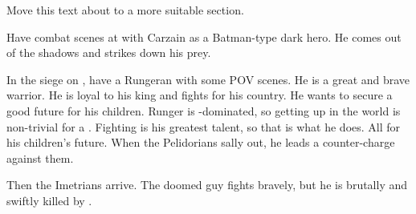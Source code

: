Move this text about  to a more suitable section. 




\begin{comment}
  \subsection{Carzain as Batman}
\end{comment}
Have combat scenes at \Forclin with Carzain as a Batman-type dark hero. 
He comes out of the shadows and strikes down his prey. 




\begin{comment}
  \section{Doomed Rungeran Scatha}
\end{comment}
\new
In the siege on \Forclin, have a Rungeran \scatha with some POV scenes.
He is a great and brave warrior.
He is loyal to his king and fights for his country.
He wants to secure a good future for his children.
Runger is \human-dominated, so getting up in the world is non-trivial for a \scatha.
Fighting is his greatest talent, so that is what he does.
All for his children's future.
When the Pelidorians sally out, he leads a counter-charge against them. 

Then the Imetrians arrive.
The doomed guy fights bravely, but he is brutally and swiftly killed by \nycans.


